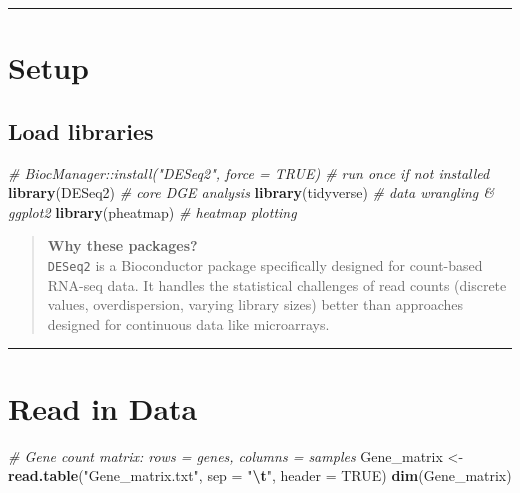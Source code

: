 \documentclass[
]{article}
\newenvironment{Shaded}{\begin{snugshade}}{\end{snugshade}}
\newcommand{\AttributeTok}[1]{\textcolor[rgb]{0.13,0.29,0.53}{#1}}
\newcommand{\CommentTok}[1]{\textcolor[rgb]{0.56,0.35,0.01}{\textit{#1}}}
\newcommand{\ConstantTok}[1]{\textcolor[rgb]{0.56,0.35,0.01}{#1}}
\newcommand{\FunctionTok}[1]{\textcolor[rgb]{0.13,0.29,0.53}{\textbf{#1}}}
\newcommand{\NormalTok}[1]{#1}
\newcommand{\OtherTok}[1]{\textcolor[rgb]{0.56,0.35,0.01}{#1}}
\newcommand{\SpecialCharTok}[1]{\textcolor[rgb]{0.81,0.36,0.00}{\textbf{#1}}}
\newcommand{\StringTok}[1]{\textcolor[rgb]{0.31,0.60,0.02}{#1}}
\begin{document}
\begin{center}\rule{0.5\linewidth}{0.5pt}\end{center}

\section{Setup}\label{setup}

\subsection{Load libraries}\label{load-libraries}

\begin{Shaded}
\begin{Highlighting}[]
\CommentTok{\# BiocManager::install("DESeq2", force = TRUE)  \# run once if not installed}
\FunctionTok{library}\NormalTok{(DESeq2)     }\CommentTok{\# core DGE analysis}
\FunctionTok{library}\NormalTok{(tidyverse)  }\CommentTok{\# data wrangling \& ggplot2}
\FunctionTok{library}\NormalTok{(pheatmap)   }\CommentTok{\# heatmap plotting}
\end{Highlighting}
\end{Shaded}

\begin{quote}
\textbf{Why these packages?}\\
\texttt{DESeq2} is a Bioconductor package specifically designed for
count-based RNA-seq data. It handles the statistical challenges of read
counts (discrete values, overdispersion, varying library sizes) better
than approaches designed for continuous data like microarrays.
\end{quote}

\begin{center}\rule{0.5\linewidth}{0.5pt}\end{center}

\section{Read in Data}\label{read-in-data}

\begin{Shaded}
\begin{Highlighting}[]
\CommentTok{\# Gene count matrix: rows = genes, columns = samples}
\NormalTok{Gene\_matrix }\OtherTok{\textless{}{-}} \FunctionTok{read.table}\NormalTok{(}\StringTok{"Gene\_matrix.txt"}\NormalTok{, }\AttributeTok{sep =} \StringTok{"}\SpecialCharTok{\textbackslash{}t}\StringTok{"}\NormalTok{, }\AttributeTok{header =} \ConstantTok{TRUE}\NormalTok{)}
\FunctionTok{dim}\NormalTok{(Gene\_matrix)}
\end{Highlighting}
\end{Shaded}
\end{document}
